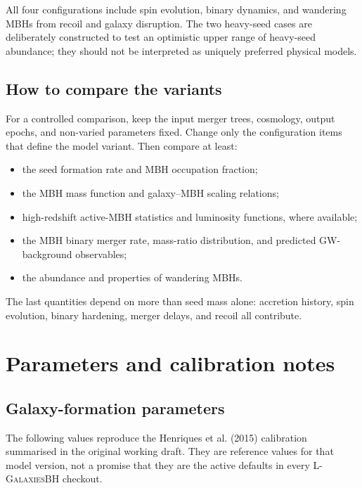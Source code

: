 \documentclass[11pt,a4paper]{article}
\newcommand{\Lgalbh}{\textsc{L-GalaxiesBH}}
\begin{document}
All four configurations include spin evolution, binary dynamics, and wandering MBHs from recoil and galaxy disruption. The two heavy-seed cases are deliberately constructed to test an optimistic upper range of heavy-seed abundance; they should not be interpreted as uniquely preferred physical models.

\subsection{How to compare the variants}

For a controlled comparison, keep the input merger trees, cosmology, output epochs, and non-varied parameters fixed. Change only the configuration items that define the model variant. Then compare at least:
\begin{itemize}
  \item the seed formation rate and MBH occupation fraction;
  \item the MBH mass function and galaxy--MBH scaling relations;
  \item high-redshift active-MBH statistics and luminosity functions, where available;
  \item the MBH binary merger rate, mass-ratio distribution, and predicted GW-background observables;
  \item the abundance and properties of wandering MBHs.
\end{itemize}

The last quantities depend on more than seed mass alone: accretion history, spin evolution, binary hardening, merger delays, and recoil all contribute.

\section{Parameters and calibration notes}\label{sec:parameters}

\subsection{Galaxy-formation parameters}

The following values reproduce the Henriques et al. (2015) calibration summarised in the original working draft. They are reference values for that model version, not a promise that they are the active defaults in every \Lgalbh{} checkout.
\end{document}
